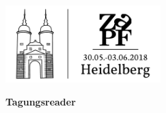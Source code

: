 \documentclass{scrbook}
\begin{document}
\pagestyle{empty}
\centering
\vspace*{-10mm}

\includegraphics[width=60mm]{vorlagen/logo_breit} 

\vspace*{14cm} \centering \fontsize{40}{48} \textbf{Tagungsreader}
\normalsize

      
\end{document}
